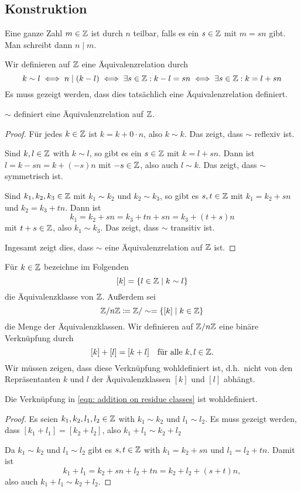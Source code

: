 \subsection{Konstruktion}

\begin{defi}
 Eine ganze Zahl $m \in \mathbb{Z}$ ist durch $n$ teilbar, falls es ein $s \in \mathbb{Z}$ mit $m = sn$ gibt. Man schreibt dann $n \mid m$.
\end{defi}

Wir definieren auf $\mathbb{Z}$ eine Äquivalenzrelation durch
\[
 k \sim l
 \iff n \mid (k-l)
 \iff \exists s \in \mathbb{Z} : k-l = sn
 \iff \exists s \in \mathbb{Z} : k = l + sn
\]
Es muss gezeigt werden, dass dies tatsächlich eine Äquivalenzrelation definiert.

\begin{beh}
 $\sim$ definiert eine Äquivalenzrelation auf $\mathbb{Z}$.
\end{beh}
\begin{proof}
 Für jedes $k \in \mathbb{Z}$ ist $k = k + 0 \cdot n$, also $k \sim k$. Das zeigt, dass $\sim$ reflexiv ist.
 
 Sind $k,l \in \mathbb{Z}$ with $k \sim l$, so gibt es ein $s \in \mathbb{Z}$ mit $k = l + sn$. Dann ist $l = k - sn = k + (-s)n$ mit $-s \in \mathbb{Z}$, also auch $l \sim k$. Das zeigt, dass $\sim$ symmetrisch ist.
 
 Sind $k_1, k_2, k_3 \in \mathbb{Z}$ mit $k_1 \sim k_2$ und $k_2 \sim k_3$, so gibt es $s, t \in \mathbb{Z}$ mit $k_1 = k_2 + sn$ und $k_2 = k_3 + tn$. Dann ist
 \[
  k_1
  = k_2 + sn
  = k_3 + tn + sn
  = k_3 + (t+s)n
 \]
 mit $t+s \in \mathbb{Z}$, also $k_1 \sim k_3$. Das zeigt, dass $\sim$ transitiv ist.
 
 Ingesamt zeigt dies, dass $\sim$ eine Äquivalenzrelation auf $\mathbb{Z}$ ist.
\end{proof}

Für $k \in \mathbb{Z}$ bezeichne im Folgenden
\[
 [k] = \{l \in \mathbb{Z} \mid k \sim l\}
\]
die Äquivalenzklasse von $\mathbb{Z}$. Außerdem sei
\[
 \mathbb{Z}/n\mathbb{Z} \coloneqq \mathbb{Z}/\sim = \{[k] \mid k \in \mathbb{Z}\}
\]
die Menge der Äquivalenzklassen. Wir definieren auf $\mathbb{Z}/n\mathbb{Z}$ eine binäre Verknüpfung durch
\begin{equation}\label{eqn: addition on residue classes}
 [k] + [l] = [k+l]
 \quad
 \text{für alle $k,l \in \mathbb{Z}$}.
\end{equation}
Wir müssen zeigen, dass diese Verknüpfung wohldefiniert ist, d.h.\ nicht von den Repräsentanten $k$ und $l$ der Äquivalenzklassen $[k]$ und $[l]$ abhängt.

\begin{beh}
 Die Verknüpfung in \eqref{eqn: addition on residue classes} ist wohldefiniert.
\end{beh}
\begin{proof}
 Es seien $k_1, k_2, l_1, l_2 \in \mathbb{Z}$ with $k_1 \sim k_2$ und $l_1 \sim l_2$. Es muss gezeigt werden, dass $[k_1+l_1] = [k_2+l_2]$, also $k_1+l_1 \sim k_2+l_2$
 
 Da $k_1 \sim k_2$ und $l_1 \sim l_2$ gibt es $s,t \in \mathbb{Z}$ with $k_1 = k_2 + sn$ und $l_1 = l_2 + tn$. Damit ist
 \[
  k_1 + l_1
  = k_2 + sn + l_2 + tn
  = k_2 + l_2 + (s+t)n,
 \]
 also auch $k_1+l_1 \sim k_2+l_2$.
\end{proof}

